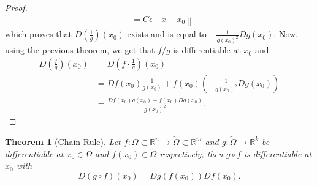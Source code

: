\documentclass{article}
\theoremstyle{plain}
\newtheorem{theorem}{Theorem}[subsection]
\theoremstyle{definition}
\newcommand{\R}{\mathbb{R}}
\newcommand{\norm}[1]{\left\lVert#1 \right\rVert}
\begin{document}
\begin{proof}
\begin{align*}
        &= C\epsilon \norm{x - x_0}
    \end{align*}
    which proves that $D(\frac{1}{g})(x_0)$ exists and is equal to $-\frac{1}{g(x_0)^2}Dg(x_0)$. Now, using the previous theorem, we get that $f/g$ is differentiable at $x_0$ and
    \begin{align*}
        D\left(\frac{f}{g}\right)(x_0) &= D\left(f \cdot \frac{1}{g}\right)(x_0) \\
        &= Df(x_0)\frac{1}{g(x_0)} + f(x_0)\left(-\frac{1}{g(x_0)^2}Dg(x_0)\right) \\
        &= \frac{Df(x_0)g(x_0) - f(x_0)Dg(x_0)}{g(x_0)^2}.
    \end{align*} 
\end{proof}

\begin{theorem}[Chain Rule]
    Let $f: \Omega \subset \R^n \to \tilde{\Omega} \subset \R^m$ and $g: \tilde{\Omega} \to \R^k$ be differentiable at $x_0 \in \Omega$ and $f(x_0) \in \tilde{\Omega}$ respectively, then $g\circ f$ is differentiable at $x_0$ with
    $$D(g\circ f)(x_0) = Dg(f(x_0))Df(x_0).$$
\end{theorem}
\end{document}
